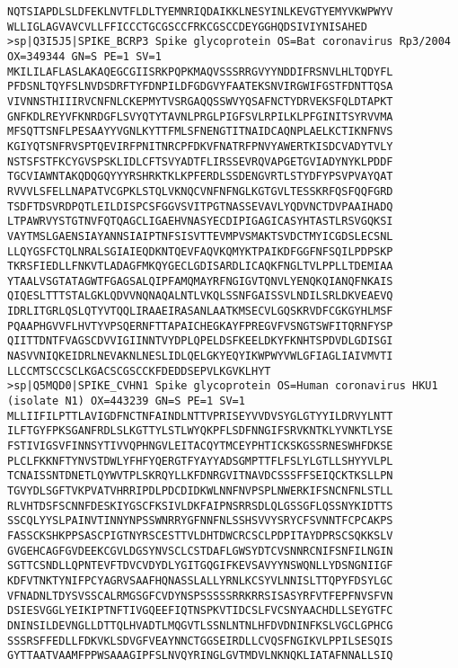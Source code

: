 \begin{lstlisting}
NQTSIAPDLSLDFEKLNVTFLDLTYEMNRIQDAIKKLNESYINLKEVGTYEMYVKWPWYV
WLLIGLAGVAVCVLLFFICCCTGCGSCCFRKCGSCCDEYGGHQDSIVIYNISAHED
>sp|Q3I5J5|SPIKE_BCRP3 Spike glycoprotein OS=Bat coronavirus Rp3/2004 OX=349344 GN=S PE=1 SV=1
MKILILAFLASLAKAQEGCGIISRKPQPKMAQVSSSRRGVYYNDDIFRSNVLHLTQDYFL
PFDSNLTQYFSLNVDSDRFTYFDNPILDFGDGVYFAATEKSNVIRGWIFGSTFDNTTQSA
VIVNNSTHIIIRVCNFNLCKEPMYTVSRGAQQSSWVYQSAFNCTYDRVEKSFQLDTAPKT
GNFKDLREYVFKNRDGFLSVYQTYTAVNLPRGLPIGFSVLRPILKLPFGINITSYRVVMA
MFSQTTSNFLPESAAYYVGNLKYTTFMLSFNENGTITNAIDCAQNPLAELKCTIKNFNVS
KGIYQTSNFRVSPTQEVIRFPNITNRCPFDKVFNATRFPNVYAWERTKISDCVADYTVLY
NSTSFSTFKCYGVSPSKLIDLCFTSVYADTFLIRSSEVRQVAPGETGVIADYNYKLPDDF
TGCVIAWNTAKQDQGQYYYRSHRKTKLKPFERDLSSDENGVRTLSTYDFYPSVPVAYQAT
RVVVLSFELLNAPATVCGPKLSTQLVKNQCVNFNFNGLKGTGVLTESSKRFQSFQQFGRD
TSDFTDSVRDPQTLEILDISPCSFGGVSVITPGTNASSEVAVLYQDVNCTDVPAAIHADQ
LTPAWRVYSTGTNVFQTQAGCLIGAEHVNASYECDIPIGAGICASYHTASTLRSVGQKSI
VAYTMSLGAENSIAYANNSIAIPTNFSISVTTEVMPVSMAKTSVDCTMYICGDSLECSNL
LLQYGSFCTQLNRALSGIAIEQDKNTQEVFAQVKQMYKTPAIKDFGGFNFSQILPDPSKP
TKRSFIEDLLFNKVTLADAGFMKQYGECLGDISARDLICAQKFNGLTVLPPLLTDEMIAA
YTAALVSGTATAGWTFGAGSALQIPFAMQMAYRFNGIGVTQNVLYENQKQIANQFNKAIS
QIQESLTTTSTALGKLQDVVNQNAQALNTLVKQLSSNFGAISSVLNDILSRLDKVEAEVQ
IDRLITGRLQSLQTYVTQQLIRAAEIRASANLAATKMSECVLGQSKRVDFCGKGYHLMSF
PQAAPHGVVFLHVTYVPSQERNFTTAPAICHEGKAYFPREGVFVSNGTSWFITQRNFYSP
QIITTDNTFVAGSCDVVIGIINNTVYDPLQPELDSFKEELDKYFKNHTSPDVDLGDISGI
NASVVNIQKEIDRLNEVAKNLNESLIDLQELGKYEQYIKWPWYVWLGFIAGLIAIVMVTI
LLCCMTSCCSCLKGACSCGSCCKFDEDDSEPVLKGVKLHYT
>sp|Q5MQD0|SPIKE_CVHN1 Spike glycoprotein OS=Human coronavirus HKU1 (isolate N1) OX=443239 GN=S PE=1 SV=1
MLLIIFILPTTLAVIGDFNCTNFAINDLNTTVPRISEYVVDVSYGLGTYYILDRVYLNTT
ILFTGYFPKSGANFRDLSLKGTTYLSTLWYQKPFLSDFNNGIFSRVKNTKLYVNKTLYSE
FSTIVIGSVFINNSYTIVVQPHNGVLEITACQYTMCEYPHTICKSKGSSRNESWHFDKSE
PLCLFKKNFTYNVSTDWLYFHFYQERGTFYAYYADSGMPTTFLFSLYLGTLLSHYYVLPL
TCNAISSNTDNETLQYWVTPLSKRQYLLKFDNRGVITNAVDCSSSFFSEIQCKTKSLLPN
TGVYDLSGFTVKPVATVHRRIPDLPDCDIDKWLNNFNVPSPLNWERKIFSNCNFNLSTLL
RLVHTDSFSCNNFDESKIYGSCFKSIVLDKFAIPNSRRSDLQLGSSGFLQSSNYKIDTTS
SSCQLYYSLPAINVTINNYNPSSWNRRYGFNNFNLSSHSVVYSRYCFSVNNTFCPCAKPS
FASSCKSHKPPSASCPIGTNYRSCESTTVLDHTDWCRCSCLPDPITAYDPRSCSQKKSLV
GVGEHCAGFGVDEEKCGVLDGSYNVSCLCSTDAFLGWSYDTCVSNNRCNIFSNFILNGIN
SGTTCSNDLLQPNTEVFTDVCVDYDLYGITGQGIFKEVSAVYYNSWQNLLYDSNGNIIGF
KDFVTNKTYNIFPCYAGRVSAAFHQNASSLALLYRNLKCSYVLNNISLTTQPYFDSYLGC
VFNADNLTDYSVSSCALRMGSGFCVDYNSPSSSSSRRKRRSISASYRFVTFEPFNVSFVN
DSIESVGGLYEIKIPTNFTIVGQEEFIQTNSPKVTIDCSLFVCSNYAACHDLLSEYGTFC
DNINSILDEVNGLLDTTQLHVADTLMQGVTLSSNLNTNLHFDVDNINFKSLVGCLGPHCG
SSSRSFFEDLLFDKVKLSDVGFVEAYNNCTGGSEIRDLLCVQSFNGIKVLPPILSESQIS
GYTTAATVAAMFPPWSAAAGIPFSLNVQYRINGLGVTMDVLNKNQKLIATAFNNALLSIQ

\end{lstlisting}
